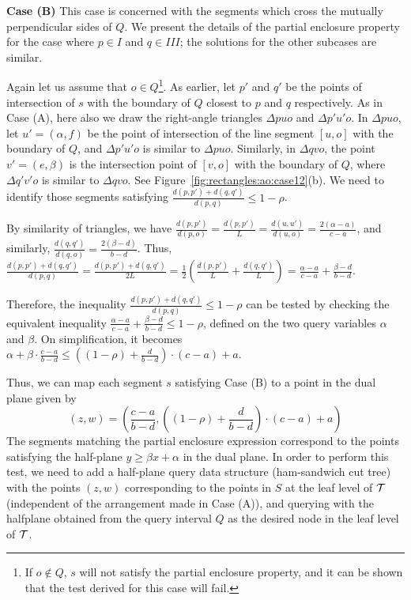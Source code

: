 {\bf Case (B)} This case is concerned with the segments which cross 
the mutually perpendicular sides of $Q$. We present the details 
of the partial enclosure property for the case where $p \in I$ 
and $q \in III$; the solutions for the other subcases  
are similar. 

Again let us assume that $o \in Q$\footnote{If $o \not\in Q$, $s$ 
will not satisfy the partial enclosure property, and it can be shown 
that the test derived for this case will fail.}. 
As earlier, let $p'$ 
and $q'$ be the points of intersection of $s$ with the boundary of 
$Q$ closest to $p$ and $q$ respectively. As in Case (A), here also 
we draw the 
right-angle triangles $\Delta p u o$ and  $\Delta p'u'o$. In 
$\Delta p u o$, let $u' = (\alpha, f)$ be the point of intersection 
of the line segment $[u, o]$ with the boundary of $Q$, and 
$\Delta p'u'o$ is similar to $\Delta p u o$. Similarly, in 
$\Delta q v o$, the point $v' = (e, \beta)$ 
is the intersection point of $[v, o]$ with the boundary of $Q$, 
where $\Delta q' v' o$ is similar to $\Delta q v o$. See 
Figure~\ref{fig:rectangles:ao:case12}(b). We need to identify those 
segments satisfying $\frac{d(p, p')+d(q, q')}{d(p, q)} \leq 1-\rho$. 

By similarity of triangles, we have  $\frac{d(p, p')}{d(p, o)} = 
\frac{d(p, p')}{L} = \frac{d(u, u')}{d(u, o)} = \frac{2(\alpha - a)}
{c - a}$, and similarly, $\frac{d(q, q')}{d(q, o)} = \frac{2(\beta - d)}{b - d}$. 
Thus,
$\frac{d(p, p') + d(q, q')}{d(p, q)}=\frac{d(p, p') + d(q, q')}{2L} 
=\frac{1}{2} \left (\frac{d(p, p')}{L} + \frac{d(q, q')}{L} \right) 
= \frac{\alpha - a}{c - a} + \frac{\beta - d}{b - d}$.

Therefore, the inequality $\frac{d(p, p') + d(q, q')}{d(p, q)} 
\leq 1 - \rho$ can be tested by checking the equivalent inequality 
$\frac{\alpha - a}{c - a} + \frac{\beta - d}{b - d} \leq 1 - \rho$, 
defined on the two query variables $\alpha$ and $\beta$. On 
simplification, it becomes $\alpha + \beta \cdot \frac{c-a}{b-d} \leq 
\left ( (1 - \rho) + \frac{d}{b-d} \right ) \cdot (c-a) + a$.

Thus, we can map each segment $s$ satisfying Case (B) to a point in the dual plane
given by
\[ (z,w)=
\left(\frac{c-a}{b-d}, \left ( (1 - \rho) + \frac{d}{b-d} \right ) \cdot (c-a) + a \right )
\]
The segments matching the 
partial enclosure expression correspond to the points satisfying the 
half-plane $y \geq \beta x + \alpha$ in the dual plane. In order 
to perform this test, we need to add a half-plane query data structure
(ham-sandwich cut tree) \cite{chan2012} with the points $(z,w)$ 
corresponding to the 
points in $S$ at the leaf level of $\cal T$ (independent of the arrangement 
made in Case (A)), and querying with the halfplane obtained from the query 
interval $Q$ as the desired node in the leaf level of $\cal T$. 


